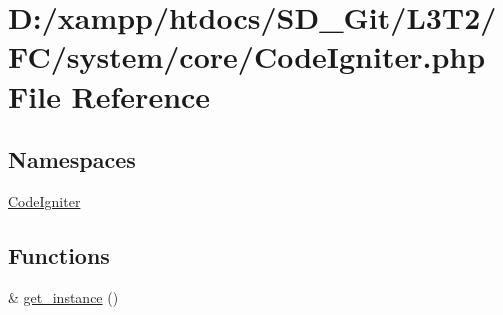 \hypertarget{_code_igniter_8php}{}\section{D\+:/xampp/htdocs/\+S\+D\+\_\+\+Git/\+L3\+T2/\+F\+C/system/core/\+Code\+Igniter.php File Reference}
\label{_code_igniter_8php}
\subsection*{Namespaces}
\begin{DoxyCompactItemize}
\item 
 \hyperlink{namespace_code_igniter}{Code\+Igniter}
\end{DoxyCompactItemize}
\subsection*{Functions}
\begin{DoxyCompactItemize}
\item 
\& \hyperlink{_code_igniter_8php_a185483844bd20a0e80955460d66d2199}{get\+\_\+instance} ()
\end{DoxyCompactItemize}
